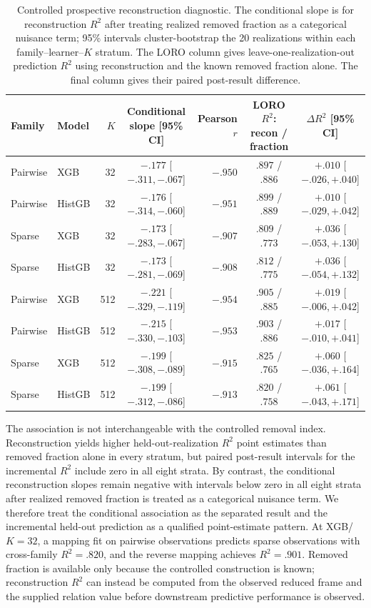 \begin{table}[t]
\caption{Controlled prospective reconstruction diagnostic. The conditional
slope is for reconstruction $R^2$ after treating realized removed fraction as
a categorical nuisance term; 95\% intervals cluster-bootstrap the 20
realizations within each family--learner--$K$ stratum. The LORO column gives
leave-one-realization-out prediction $R^2$ using reconstruction and the known
removed fraction alone. The final column gives their paired post-result
difference.}
\label{tab:app-reconstructibility-controlled}
\centering\scriptsize
\setlength{\tabcolsep}{2.5pt}
\begin{tabular}{llrcrcc}
\toprule
Family & Model & $K$ & Conditional slope [95\% CI] & Pearson $r$ & LORO $R^2$: recon / fraction & $\Delta R^2$ [95\% CI] \\
\midrule
Pairwise & XGB & 32  & $-.177$ [$-.311,-.067$] & $-.950$ & $.897$ / $.886$ & $+.010$ [$-.026,+.040$] \\
Pairwise & HistGB & 32  & $-.176$ [$-.314,-.060$] & $-.951$ & $.899$ / $.889$ & $+.010$ [$-.029,+.042$] \\
Sparse & XGB & 32  & $-.173$ [$-.283,-.067$] & $-.907$ & $.809$ / $.773$ & $+.036$ [$-.053,+.130$] \\
Sparse & HistGB & 32  & $-.173$ [$-.281,-.069$] & $-.908$ & $.812$ / $.775$ & $+.036$ [$-.054,+.132$] \\
\addlinespace[1pt]
Pairwise & XGB & 512 & $-.221$ [$-.329,-.119$] & $-.954$ & $.905$ / $.885$ & $+.019$ [$-.006,+.042$] \\
Pairwise & HistGB & 512 & $-.215$ [$-.330,-.103$] & $-.953$ & $.903$ / $.886$ & $+.017$ [$-.010,+.041$] \\
Sparse & XGB & 512 & $-.199$ [$-.308,-.089$] & $-.915$ & $.825$ / $.765$ & $+.060$ [$-.036,+.164$] \\
Sparse & HistGB & 512 & $-.199$ [$-.312,-.086$] & $-.913$ & $.820$ / $.758$ & $+.061$ [$-.043,+.171$] \\
\bottomrule
\end{tabular}
\end{table}

The association is not interchangeable with the controlled removal index.
Reconstruction yields higher held-out-realization $R^2$ point estimates than
removed fraction alone in every stratum, but paired post-result intervals for
the incremental $R^2$ include zero in all eight strata. By contrast, the
conditional reconstruction slopes remain negative with intervals below zero
in all eight strata after realized removed fraction is treated as a categorical
nuisance term. We therefore treat the conditional association as the separated
result and the incremental held-out prediction as a qualified point-estimate
pattern. At XGB/$K=32$, a mapping fit on pairwise observations predicts sparse
observations with cross-family $R^2=.820$, and the reverse mapping achieves
$R^2=.901$.  Removed fraction is available only because the controlled
construction is known; reconstruction $R^2$ can instead be computed from the
observed reduced frame and the supplied relation value before downstream
predictive performance is observed.


